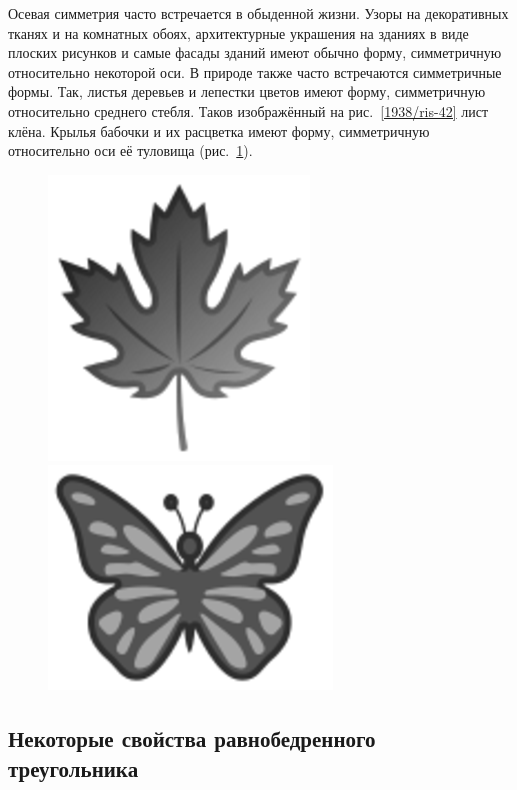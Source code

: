 \documentclass[oneside]{book}
\begin{document}
Осевая симметрия часто встречается в обыденной жизни.
Узоры на декоративных тканях и на комнатных обоях, архитектурные украшения на зданиях в виде плоских рисунков и самые фасады зданий имеют обычно форму, симметричную относительно некоторой оси.
В природе также часто встречаются симметричные формы.
Так, листья деревьев и лепестки цветов имеют форму, симметричную относительно среднего стебля.
Таков изображённый на рис.~\ref{1938/ris-42} лист клёна.
Крылья бабочки и их расцветка имеют форму, симметричную относительно оси её туловища (рис.~\ref{1938/ris-43}).

\begin{figure}[h!]
\begin{minipage}{.48\textwidth}
\centering
\includegraphics{eps/klenovyj-list}
\caption{}\label{1938/ris-42}
\end{minipage}\hfill
\begin{minipage}{.48\textwidth}
\centering
\includegraphics{eps/babochka}
\caption{}\label{1938/ris-43}
\end{minipage}
\end{figure}

\subsection*{Некоторые свойства равнобедренного треугольника}
\end{document}
